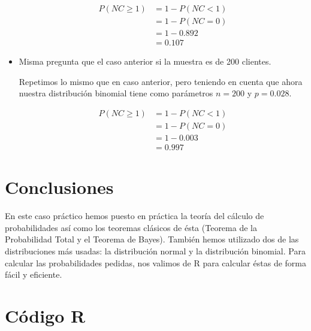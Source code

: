 \documentclass[12pt,a4paper,twoside,openright,titlepage,final]{article}
\begin{document}
\begin{itemize}
\begin{align*}
P(NC \geq 1) &= 1 - P(NC < 1) \\ &= 1 - P(NC = 0) \\ &= 1 - 0.892 \\ &= 0.107
\end{align*}  

\item Misma pregunta que el caso anterior si la muestra es de 200 clientes.

Repetimos lo mismo que en caso anterior, pero teniendo en cuenta que ahora nuestra distribución binomial tiene como parámetros $n = 200$ y $p = 0.028$.

\begin{align*}
P(NC \geq 1) &= 1 - P(NC < 1) \\ &= 1 - P(NC = 0) \\ &= 1 - 0.003 \\ &= 0.997
\end{align*}

\end{itemize}

\section{Conclusiones}

En este caso práctico hemos puesto en práctica la teoría del cálculo de probabilidades así como los teoremas clásicos de ésta (Teorema de la Probabilidad Total y el Teorema de Bayes). También hemos utilizado dos de las distribuciones más usadas: la distribución normal y la distribución binomial. Para calcular las probabilidades pedidas, nos valimos de R para calcular éstas de forma fácil y eficiente.    

\newpage

\section{Código R}


\end{document}
